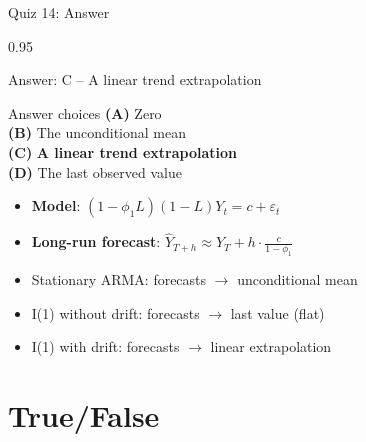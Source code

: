 \documentclass[9pt, aspectratio=169, t]{beamer}
\begin{document}
\begin{frame}{Quiz 14: Answer}
    \begin{cminipage}{0.95\textwidth}
    {\small
    \begin{exampleblock}{Answer: C -- A linear trend extrapolation}

        \vspace{0.1cm}

    \begin{block}{Answer choices}
        \textcolor{MainBlue}{\textbf{(A)}} Zero \incorrect\\[3pt]
        \textcolor{MainBlue}{\textbf{(B)}} The unconditional mean \incorrect\\[3pt]
        \textcolor{MainBlue}{\textbf{(C)}} \textbf{\textcolor{Forest}{A linear trend extrapolation}} \correct\\[3pt]
        \textcolor{MainBlue}{\textbf{(D)}} The last observed value \incorrect
    \end{block}

        \vspace{0.2cm}

        \begin{itemize}
            \item \textbf{Model}: $(1-\phi_1 L)(1-L)Y_t = c + \varepsilon_t$
            \item \textbf{Long-run forecast}: $\hat{Y}_{T+h} \approx Y_T + h \cdot \frac{c}{1-\phi_1}$
            \item Stationary ARMA: forecasts $\to$ unconditional mean
            \item I(1) without drift: forecasts $\to$ last value (flat)
            \item I(1) with drift: forecasts $\to$ linear extrapolation
        \end{itemize}
    \end{exampleblock}
    }

    \end{cminipage}
\end{frame}

\section{True/False}
\end{document}
